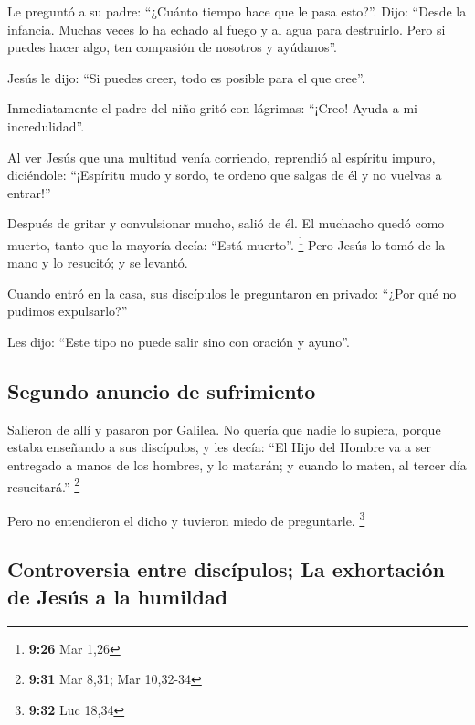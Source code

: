  Le preguntó a su padre: ``¿Cuánto tiempo hace que le
pasa esto?''. Dijo: ``Desde la infancia.  Muchas veces lo
ha echado al fuego y al agua para destruirlo. Pero si puedes hacer algo,
ten compasión de nosotros y ayúdanos''.

 Jesús le dijo: ``Si puedes creer, todo es posible para
el que cree''.

 Inmediatamente el padre del niño gritó con lágrimas:
``¡Creo! Ayuda a mi incredulidad''.

 Al ver Jesús que una multitud venía corriendo, reprendió
al espíritu impuro, diciéndole: ``¡Espíritu mudo y sordo, te ordeno que
salgas de él y no vuelvas a entrar!''

 Después de gritar y convulsionar mucho, salió de él. El
muchacho quedó como muerto, tanto que la mayoría decía: ``Está muerto''.
\footnote{\textbf{9:26} Mar 1,26}  Pero Jesús lo tomó de
la mano y lo resucitó; y se levantó.

 Cuando entró en la casa, sus discípulos le preguntaron
en privado: ``¿Por qué no pudimos expulsarlo?''

 Les dijo: ``Este tipo no puede salir sino con oración y
ayuno''.

\hypertarget{segundo-anuncio-de-sufrimiento}{%
\subsection{Segundo anuncio de
sufrimiento}\label{segundo-anuncio-de-sufrimiento}}

 Salieron de allí y pasaron por Galilea. No quería que
nadie lo supiera,  porque estaba enseñando a sus
discípulos, y les decía: ``El Hijo del Hombre va a ser entregado a manos
de los hombres, y lo matarán; y cuando lo maten, al tercer día
resucitará.'' \footnote{\textbf{9:31} Mar 8,31; Mar 10,32-34}

 Pero no entendieron el dicho y tuvieron miedo de
preguntarle. \footnote{\textbf{9:32} Luc 18,34}

\hypertarget{controversia-entre-discuxedpulos-la-exhortaciuxf3n-de-jesuxfas-a-la-humildad}{%
\subsection{Controversia entre discípulos; La exhortación de Jesús a la
humildad}\label{controversia-entre-discuxedpulos-la-exhortaciuxf3n-de-jesuxfas-a-la-humildad}}

